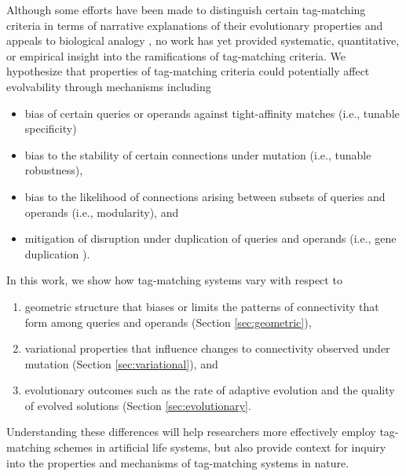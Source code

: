 Although some efforts have been made to distinguish certain tag-matching criteria in terms of narrative explanations of their evolutionary properties and appeals to biological analogy \citep{downing2015intelligence,scherer2004activation}, no work has yet provided systematic, quantitative, or empirical insight into the ramifications of tag-matching criteria.
We hypothesize that properties of tag-matching criteria could potentially affect evolvability through mechanisms including
\begin{itemize}
  \item bias of certain queries or operands against tight-affinity matches (i.e., tunable specificity)
  \item bias to the stability of certain connections under mutation (i.e., tunable robustness),
  \item bias to the likelihood of connections arising between subsets of queries and operands (i.e., modularity), and
  \item mitigation of disruption under duplication of queries and operands (i.e., gene duplication \citep{ohno2013evolution, lewis1978gene}).
\end{itemize}

In this work, we show how tag-matching systems vary with respect to
\begin{enumerate}
  \item geometric structure that biases or limits the patterns of connectivity that form among queries and operands (Section \ref{sec:geometric}),
  \item variational properties that influence changes to connectivity observed under mutation (Section \ref{sec:variational}), and
  \item evolutionary outcomes such as the rate of adaptive evolution and the quality of evolved solutions (Section \ref{sec:evolutionary}.
\end{enumerate}
Understanding these differences will help researchers more effectively employ tag-matching schemes in artificial life systems, but also provide context for inquiry into the properties and mechanisms of tag-matching systems in nature.   



